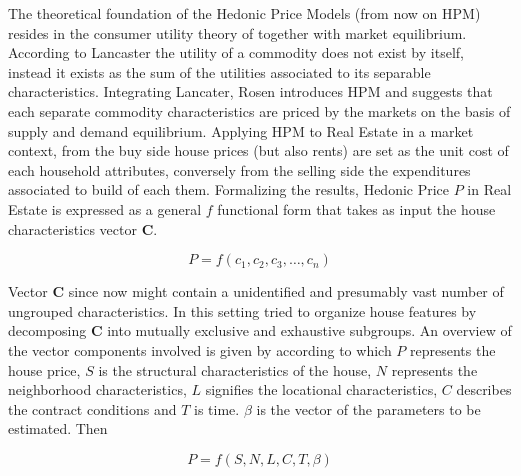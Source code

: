\documentclass[
  12pt,
  a4paper,
  oneside]{book}
\theoremstyle{definition}
\theoremstyle{definition}
\theoremstyle{definition}
\theoremstyle{remark}
\begin{document}
The theoretical foundation of the Hedonic Price Models (from now on HPM) resides in the consumer utility theory of \citet{Lancaster} together with \citet{Rosen} market equilibrium. According to Lancaster the utility of a commodity does not exist by itself, instead it exists as the sum of the utilities associated to its separable characteristics. Integrating Lancater, Rosen introduces HPM and suggests that each separate commodity characteristics are priced by the markets on the basis of supply and demand equilibrium. Applying HPM to Real Estate in a market context, from the buy side house prices (but also rents) are set as the unit cost of each household attributes, conversely from the selling side the expenditures associated to build of each them.
Formalizing the results, Hedonic Price \(P\) in Real Estate is expressed as a general \(f\) functional form that takes as input the house characteristics vector \(\mathbf{C}\).

\[P=f\left(c_{1}, c_{2}, c_{3}, \ldots, c_{n}\right)\]

Vector \(\mathbf{C}\) since now might contain a unidentified and presumably vast number of ungrouped characteristics. In this setting \citet{Malpezzi} tried to organize house features by decomposing \(\mathbf{C}\) into mutually exclusive and exhaustive subgroups. An overview of the vector components involved is given by \citet{Ling} according to which \(P\) represents the house price, \(S\) is the structural characteristics of the house, \(N\) represents the neighborhood characteristics, \(L\) signifies the locational characteristics, \(C\) describes the contract conditions and \(T\) is time. \(\beta\) is the vector of the parameters to be estimated. Then

\[P=f\left(S, N, L, C, T, \beta\right)\]
\end{document}
